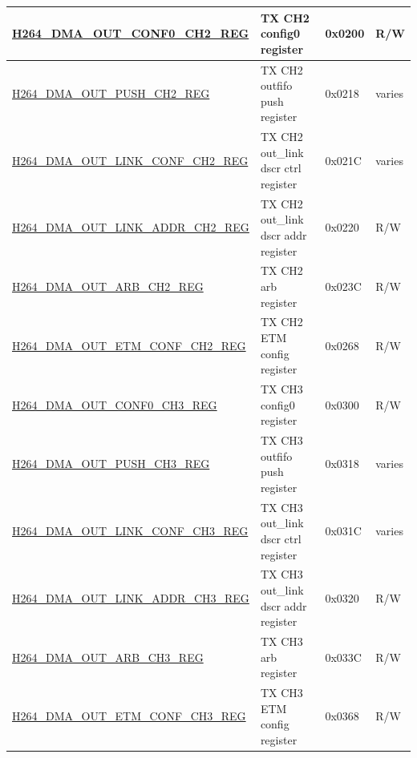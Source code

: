 \begin{longtable}{ | p{7.5cm} | p{5.7cm} | p{1.2cm} | p{1cm} | }
    \hyperref[regdesc:H264DMAOUTCONF0CH2REG]{H264\_DMA\_OUT\_CONF0\_CH2\_REG} & TX CH2 config0 register & 0x0200 & R/W \\ \hline
    \hyperref[regdesc:H264DMAOUTPUSHCH2REG]{H264\_DMA\_OUT\_PUSH\_CH2\_REG} & TX CH2 outfifo push register & 0x0218 & varies \\ \hline
    \hyperref[regdesc:H264DMAOUTLINKCONFCH2REG]{H264\_DMA\_OUT\_LINK\_CONF\_CH2\_REG} & TX CH2 out\_link dscr ctrl register & 0x021C & varies \\ \hline
    \hyperref[regdesc:H264DMAOUTLINKADDRCH2REG]{H264\_DMA\_OUT\_LINK\_ADDR\_CH2\_REG} & TX CH2 out\_link dscr addr register & 0x0220 & R/W \\ \hline
    \hyperref[regdesc:H264DMAOUTARBCH2REG]{H264\_DMA\_OUT\_ARB\_CH2\_REG} & TX CH2 arb register & 0x023C & R/W \\ \hline
    \hyperref[regdesc:H264DMAOUTETMCONFCH2REG]{H264\_DMA\_OUT\_ETM\_CONF\_CH2\_REG} & TX CH2 ETM config register & 0x0268 & R/W \\ \hline
    
    \hyperref[regdesc:H264DMAOUTCONF0CH3REG]{H264\_DMA\_OUT\_CONF0\_CH3\_REG} & TX CH3 config0 register & 0x0300 & R/W \\ \hline
    \hyperref[regdesc:H264DMAOUTPUSHCH3REG]{H264\_DMA\_OUT\_PUSH\_CH3\_REG} & TX CH3 outfifo push register & 0x0318 & varies \\ \hline
    \hyperref[regdesc:H264DMAOUTLINKCONFCH3REG]{H264\_DMA\_OUT\_LINK\_CONF\_CH3\_REG} & TX CH3 out\_link dscr ctrl register & 0x031C & varies \\ \hline
    \hyperref[regdesc:H264DMAOUTLINKADDRCH3REG]{H264\_DMA\_OUT\_LINK\_ADDR\_CH3\_REG} & TX CH3 out\_link dscr addr register & 0x0320 & R/W \\ \hline
    \hyperref[regdesc:H264DMAOUTARBCH3REG]{H264\_DMA\_OUT\_ARB\_CH3\_REG} & TX CH3 arb register & 0x033C & R/W \\ \hline
    \hyperref[regdesc:H264DMAOUTETMCONFCH3REG]{H264\_DMA\_OUT\_ETM\_CONF\_CH3\_REG} & TX CH3 ETM config register & 0x0368 & R/W \\ \hline
    

\end{longtable}
